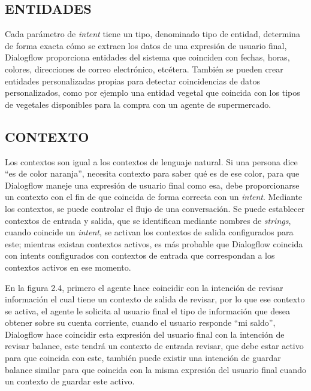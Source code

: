 \documentclass[letter, openright, 12pt]{book}
\begin{document}
\subsection{ENTIDADES}
Cada parámetro de \textit{intent} tiene un tipo, denominado tipo de entidad, determina de forma exacta cómo se extraen los datos de una expresión de usuario final, Dialogflow proporciona entidades del sistema que coinciden con fechas, horas, colores, direcciones de correo electrónico, etcétera. También se pueden crear entidades personalizadas propias para detectar coincidencias de datos personalizados, como por ejemplo una entidad vegetal que coincida con los tipos de vegetales disponibles para la compra con un agente de supermercado. 

\subsection{CONTEXTO}
Los contextos son igual a los contextos de lenguaje natural. Si una persona dice “es de color naranja”, necesita contexto para saber qué es de ese color, para que Dialogflow maneje una expresión de usuario final como esa, debe proporcionarse un contexto con el fin de que coincida de forma correcta con un \textit{intent}. Mediante los contextos, se puede controlar el flujo de una conversación. Se puede establecer contextos de entrada y salida, que se identifican mediante nombres de \textit{strings}, cuando coincide un \textit{intent}, se activan los contextos de salida configurados para este; mientras existan contextos activos, es más probable que Dialogflow coincida con intents configurados con contextos de entrada que correspondan a los contextos activos en ese momento.

\par
En la figura 2.4, primero el agente hace coincidir con la intención de revisar información el cual tiene un contexto de salida de revisar, por lo que ese contexto se activa, el agente le solicita al usuario final el tipo de información que desea obtener sobre su cuenta corriente, cuando el usuario responde “mi saldo”, Dialogflow hace coincidir esta expresión del usuario final con la intención de revisar balance, este tendrá un contexto de entrada revisar, que debe estar activo para que coincida con este, también puede existir una intención de guardar balance similar para que coincida con la misma expresión del usuario final cuando un contexto de guardar este activo.
\end{document}
